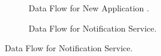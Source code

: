 \documentclass[12pt]{article}
\begin{document}
\begin{figure}
\begin{subfigure}[p]{0.47\textwidth}
\centering	
{}
\caption{Data Flow for New Application .}
\end{subfigure}

\begin{subfigure}[p]{0.47\textwidth}
\centering	
{}
\caption{Data Flow for Notification Service.}
\end{subfigure}


\end{figure}
\end{document}
